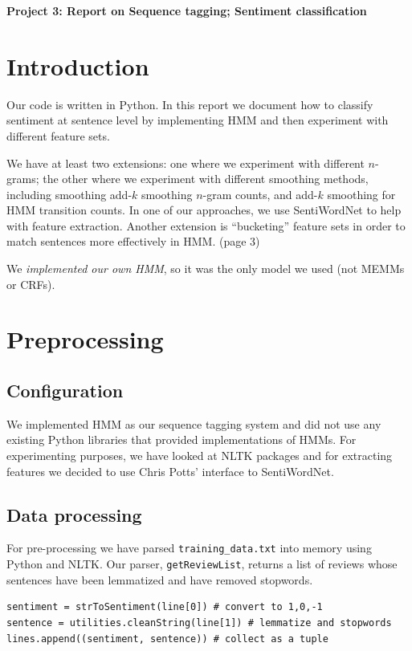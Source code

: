 \documentclass{article}
\begin{document}
\begin{center}\textbf{Project 3: Report on Sequence tagging; Sentiment classification}\end{center}


\section{Introduction}
Our code is written in Python. In this report we document how to classify sentiment at sentence level by implementing HMM and then experiment with different feature sets.\par
We have at least two extensions: one where we experiment with different $n$-grams; the other where we experiment with different smoothing methods, including smoothing add-$k$ smoothing $n$-gram counts, and add-$k$ smoothing for HMM transition counts. In one of our approaches, we use SentiWordNet to help with feature extraction. Another extension is ``bucketing'' feature sets in order to match sentences more effectively in HMM. (page 3)\par
We \emph{implemented our own HMM}, so it was the only model we used (not MEMMs or CRFs).


\section{Preprocessing}

\subsection{Configuration}
We implemented HMM as our sequence tagging system and did not use any existing Python libraries that provided implementations of HMMs. For experimenting purposes, we have looked at NLTK packages and for extracting features we decided to use Chris Potts' interface to SentiWordNet.


\subsection{Data processing}
For pre-processing we have parsed \texttt{training\_data.txt} into memory using Python and NLTK. Our parser, \texttt{getReviewList}, returns a list of reviews whose sentences have been lemmatized and have removed stopwords.

\begin{verbatim}
sentiment = strToSentiment(line[0]) # convert to 1,0,-1
sentence = utilities.cleanString(line[1]) # lemmatize and stopwords
lines.append((sentiment, sentence)) # collect as a tuple
\end{verbatim}
\end{document}
